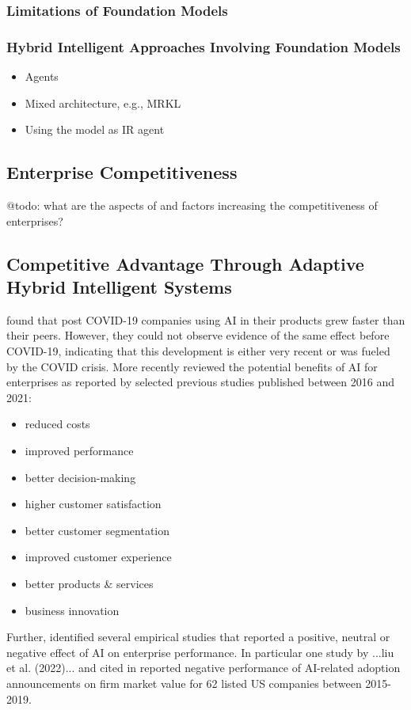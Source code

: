 \subsubsection{Limitations of Foundation Models}

\subsubsection{Hybrid Intelligent Approaches Involving Foundation Models}

\begin{itemize}
    \item Agents 
    \item Mixed architecture, e.g., MRKL
    \item Using the model as IR agent 
\end{itemize}





\subsection{Enterprise Competitiveness}

{\color{purple} @todo: what are the aspects of and factors increasing the competitiveness of enterprises?}


\subsection{Competitive Advantage Through Adaptive Hybrid Intelligent Systems}

\cite{xuCanArtificialIntelligence2021} found that post COVID-19 companies using AI in their products grew
faster than their peers. However, they could not observe evidence of the same effect before COVID-19, indicating
that this development is either very recent or was fueled by the COVID crisis. More recently
\cite{hoArtificialIntelligenceFirm2022} reviewed the potential benefits of AI for enterprises as reported
by selected previous studies published between 2016 and 2021:

\begin{itemize}
    \item reduced costs
    \item improved performance
    \item better decision-making
    \item higher customer satisfaction
    \item better customer segmentation
    \item improved customer experience
    \item better products \& services
    \item business innovation
\end{itemize}

Further, \cite{hoArtificialIntelligenceFirm2022} identified several empirical studies that reported a positive,
neutral or negative effect of AI on enterprise performance. In particular one study by ...liu et al. (2022)...
and cited in \cite{hoArtificialIntelligenceFirm2022} reported negative performance of AI-related adoption 
announcements on firm market value for 62 listed US companies between 2015-2019.
